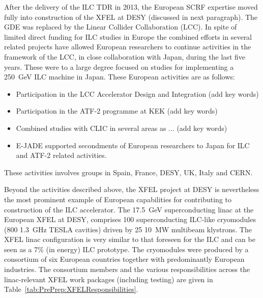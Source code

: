 \documentclass[%
 reprint,
 amsmath,amssymb,
 aps,
]{revtex4-1}
\begin{document}
After the delivery of the ILC TDR in 2013, the European SCRF expertise moved fully into construction of the XFEL at DESY (discussed in next paragraph). 
The GDE was replaced by the Linear Collider Collaboration (LCC). In spite of limited direct funding for ILC studies in Europe the combined efforts in 
several related projects have allowed European researchers to continue activities in the framework of the LCC, in close collaboration with Japan, during
the last five years. These were to a large degree focused on studies for implementing a 250~GeV ILC machine in Japan. 
These European activities are as follows:
\begin{itemize}
\item Participation in the LCC Accelerator Design and Integration (add key words)
\item Participation in the ATF-2 programme at KEK (add key words)
\item Combined studies with CLIC in several areas as ... (add key words)
\item E-JADE supported secondments of European researchers to Japan for ILC and ATF-2 related activities.
\end{itemize}
These activities involves groups in Spain, France, DESY, UK, Italy and CERN. 



\vspace{0.15cm}
Beyond the activities described above, the XFEL project at DESY is nevertheless the most prominent example of European capabilities for contributing to construction of the ILC accelerator.
The 17.5~GeV superconducting linac at the European XFEL at DESY, comprises 100 superconducting ILC-like cryomodules (800 1.3~GHz TESLA cavities) driven by 25 10~MW multibeam klystrons. The XFEL linac configuration is very similar to that foreseen for the ILC and can be seen as a 7\% (in energy) ILC prototype. The cryomodules were produced by a consortium of six European countries together with predominantly European industries. The consortium members and the various responsibilities across the linac-relevant XFEL work packages (including testing) are given in Table~\ref{tab:PrePrep:XFELResponsibilities}.
\end{document}
